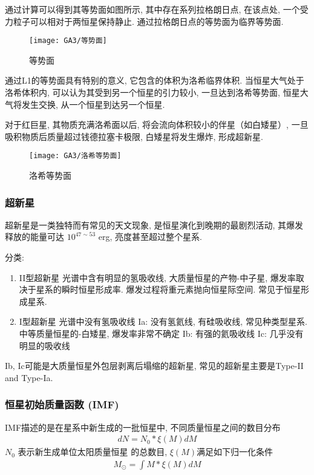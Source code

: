 \small
通过计算可以得到其等势面如图所示, 其中存在系列拉格朗日点, 在该点处, 一个受力粒子可以相对于两恒星保持静止. 通过拉格朗日点的等势面为临界等势面. 

\begin{figure}[!htb]
    \centering
    \texttt{[image: GA3/等势面]}
    \caption{等势面}
\end{figure}


通过L1的等势面具有特别的意义, 它包含的体积为洛希临界体积. 当恒星大气处于洛希体积内, 可以认为其受到另一个恒星的引力较小, 一旦达到洛希等势面, 恒星大气将发生交换, 从一个恒星到达另一个恒星.
\normalsize 

对于红巨星, 其物质充满洛希面以后, 将会流向体积较小的伴星（如白矮星）, 一旦吸积物质后质量超过钱德拉塞卡极限, 白矮星将发生爆炸, 形成超新星. 

\begin{figure}[!htb]
    \centering
    \texttt{[image: GA3/洛希等势面]}
    \caption{洛希等势面}
\end{figure}


\subsubsection{超新星}
超新星是一类独特而有常见的天文现象, 是恒星演化到晚期的最剧烈活动, 其爆发释放的能量可达 $10^{47\sim 53}$ erg, 亮度甚至超过整个星系. 

分类: 
\begin{enumerate}\small
    \item II型超新星
    \subitem 光谱中含有明显的氢吸收线, 大质量恒星的产物-中子星, 爆发率取决于星系的瞬时恒星形成率. 
    \subitem 爆发过程将重元素抛向恒星际空间. 
    \subitem 常见于恒星形成星系. 
    \item I型超新星
    \subitem 光谱中没有氢吸收线
    \subitem Ia: 没有氢氦线, 有硅吸收线, 常见种类型星系. 中等质量恒星的-白矮星, 爆发率非常不确定
    \subitem Ib: 有强的氦吸收线
    \subitem Ic: 几乎没有明显的吸收线
\end{enumerate}
Ib, Ic可能是大质量恒星外包层剥离后塌缩的超新星, 常见的超新星主要是Type-II and Type-Ia. 

\subsubsection{恒星初始质量函数 (IMF)}
IMF描述的是在星系中新生成的一批恒星中, 不同质量恒星之间的数目分布
\begin{align*}
    dN=N_0 * \xi (M)dM
\end{align*}
$N_0$ 表示新生成单位太阳质量恒星
的总数目, $\xi(M)$满足如下归一化条件
\begin{align*}
    M_{\odot}=\int M*\xi(M)dM
\end{align*}

